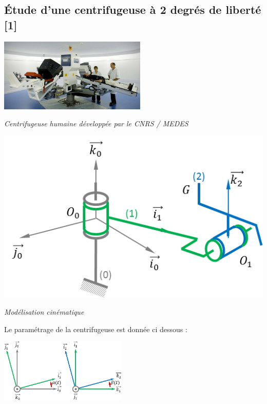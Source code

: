 \documentclass[10pt,fleqn]{article} %
\begin{document}
\begin{multicols}{2}

\section*{Étude d'une centrifugeuse à 2 degrés de liberté [1]}

\begin{center}
\includegraphics[height=3.5cm]{images/centrifugeuse_1}

\textit{Centrifugeuse humaine développée par le CNRS / MEDES } 
\end{center}



\begin{center}
\includegraphics[width=0.9\linewidth]{images/centrifugeuse_2}

\textit{Modélisation cinématique} 
\end{center}



Le paramétrage de la centrifugeuse est donnée ci dessous : 



\begin{center}
\includegraphics[height=3cm]{images/centrifugeuse_3}
\end{center}



\end{multicols}
\end{document}
